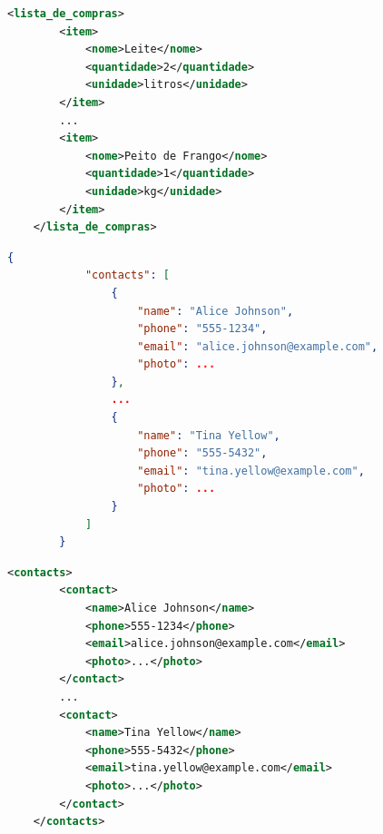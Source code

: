 \documentclass{article}
\begin{document}
    \begin{lstlisting}[language=xml, caption=Lista de compras XML.]
    <lista_de_compras>
        <item>
            <nome>Leite</nome>
            <quantidade>2</quantidade>
            <unidade>litros</unidade>
        </item>
        ...
        <item>
            <nome>Peito de Frango</nome>
            <quantidade>1</quantidade>
            <unidade>kg</unidade>
        </item>
    </lista_de_compras>
    \end{lstlisting}
    
    
    \begin{lstlisting}[language=json, caption=Agenda de contatos Json. Sem a foto e alguns contatos para não ficar muito grande.]
        {
            "contacts": [
                {
                    "name": "Alice Johnson",
                    "phone": "555-1234",
                    "email": "alice.johnson@example.com",
                    "photo": ...
                },
                ...
                {
                    "name": "Tina Yellow",
                    "phone": "555-5432",
                    "email": "tina.yellow@example.com",
                    "photo": ...
                }
            ]
        }
    \end{lstlisting}
    
    
    \begin{lstlisting}[language=xml, caption=Agenda de contatos XML. Sem a foto e alguns contatos para não ficar muito grande.]
    <contacts>
        <contact>
            <name>Alice Johnson</name>
            <phone>555-1234</phone>
            <email>alice.johnson@example.com</email>
            <photo>...</photo>
        </contact>
        ...
        <contact>
            <name>Tina Yellow</name>
            <phone>555-5432</phone>
            <email>tina.yellow@example.com</email>
            <photo>...</photo>
        </contact>
    </contacts>
    \end{lstlisting}
    
    
\end{document}
